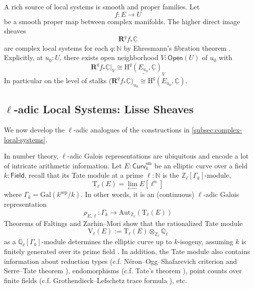 \documentclass[11pt,letterpaper]{article}
\theoremstyle{numberfirstplain}
\numberwithin{equation}{theorem}
\theoremstyle{numberfirstupright}
\begin{document}
\begin{example}\label{ex:complex-smooth-proper-families}A rich source of local systems is smooth and proper families. Let
$$f:E\rightarrow U$$
be a smooth proper map between complex manifolds. 
The higher direct image sheaves
$$\mathbf R^q f_{*}\underline{\mathbb C}$$
are complex local systems for each $q:\mathbb N$ by Ehresmann's fibration theorem \cite[Theorem~9.3]{Voisin2002HodgeI}.
Explicitly, at $u_0:U$, there exists open neighborhood $V:\mathsf{Open}(U)$ of $u_0$ with 
$$\mathbf R^qf_*\underline{\mathbb C}|_V\cong \underline{\mathrm H^q(E_{u_0},\underline{\mathbb C})}_V$$
In particular on the level of stalks 
$\bigl(\mathbf R^qf_*\underline{\mathbb C}\bigr)_{u_0}\cong\mathrm H^q(E_{u_0},\underline{\mathbb C})$. 
\end{example}


\subsection{\texorpdfstring{$\ell$}{l}-adic Local Systems: Lisse Sheaves}\label{subsec:ell-adic-local-systems}

We now develop the $\ell$-adic analogues of the constructions in \cref{subsec:complex-local-systems}.

In number theory, $\ell$-adic Galois representations are ubiquitous and encode a lot of intricate arithmetic information. 
Let $E:\mathsf{Curv}_k^{\mathrm{sm}}$ be an elliptic curve over a field $k:\mathsf{Field}$, recall that its Tate module at a prime $\ell:\mathbb N$ is the $\mathbb Z_\ell[\Gamma_k]$-module, 
$$\mathrm{T}_\ell(E)=\lim_{\longleftarrow}E[\ell^n]$$
where $\Gamma_k=\mathrm{Gal}(k^{\mathrm{sep}}/k)$. In other words, it is an (continuous) $\ell$-adic Galois representation
$$\rho_{E,\ell}:\Gamma_k\rightarrow\mathrm{Aut}_{\mathbb Z_\ell}(\mathrm{T}_\ell (E))$$
Theorems of Faltings and Zarhin–Mori show that the rationalized Tate module
$$\mathrm{V}_\ell(E):=\mathrm{T}_\ell(E)\otimes_{\mathbb Z_\ell} \mathbb Q_\ell$$
as a $\mathbb Q_\ell [\Gamma_k]$-module determines the elliptic curve up to $k$-isogeny, assuming $k$ is finitely generated over its prime field \cite{Faltings1983,Zarhin1976,Mori1978}. 
In addition, the Tate module also contains information about reduction types (c.f. Néron–Ogg–Shafarevich criterion \cite[Theorem~VII.7.1]{Silverman2009} and Serre–Tate theorem \cite[Theorem~1]{SerreTate1968}), endomorphisms (c.f. Tate's theorem \cite[Main Theorem]{Tate1966}), point counts over finite fields (c.f. Grothendieck–Lefschetz trace formula \cite[Theorem~29.4]{Milne2013EtaleCohomology}), etc. 
\end{document}
